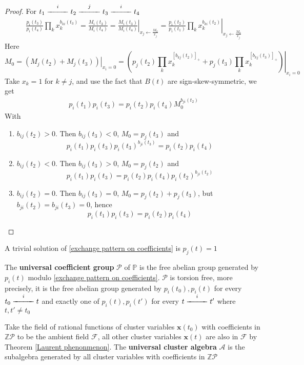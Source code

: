 \documentclass[main]{subfiles}
\begin{document}
\begin{proof}
For $t_1\xedge it_2\xedge jt_3\xedge it_4$
\begin{align*}
\frac{p_i(t_3)}{p_i(t_4)}\prod_kx_k^{b_{ki}(t_3)}=\frac{M_i(t_3)}{M_i(t_4)}=\left.\frac{M_i(t_3)}{M_i(t_4)}\right|_{x_j\leftarrow\frac{M_0}{x_j}}=\left.\frac{p_i(t_2)}{p_i(t_1)}\prod_kx_k^{b_{ki}(t_2)}\right|_{x_j\leftarrow\frac{M_0}{x_j}}
\end{align*}
Here
\[M_0=\left.\left(M_j(t_2)+M_j(t_3)\right)\right|_{x_i=0}=\left.\left(p_j(t_2)\prod_kx_k^{[b_{kj}(t_2)]_+}+p_j(t_3)\prod_kx_k^{[b_{kj}(t_3)]_+}\right)\right|_{x_i=0}\]
Take $x_k=1$ for $k\neq j$, and use the fact that $B(t)$ are sign-skew-symmetric, we get
\begin{align*}
p_i(t_1)p_i(t_3)=p_i(t_2)p_i(t_4)M_0^{b_{ji}(t_2)}
\end{align*}
With
\begin{enumerate}[leftmargin=*,label=Case \arabic*:]
\item $b_{ij}(t_2)>0$. Then $b_{ij}(t_3)<0$, $M_0=p_j(t_3)$ and
\[p_i(t_1)p_i(t_3)p_i(t_3)^{b_{ji}(t_3)}=p_i(t_2)p_i(t_4)\]
\item $b_{ij}(t_2)<0$. Then $b_{ij}(t_3)>0$, $M_0=p_j(t_2)$ and
\[p_i(t_1)p_i(t_3)=p_i(t_2)p_i(t_4)p_i(t_2)^{b_{ji}(t_2)}\]
\item $b_{ij}(t_2)=0$. Then $b_{ij}(t_3)=0$, $M_0=p_j(t_2)+p_j(t_3)$, but $b_{ji}(t_2)=b_{ji}(t_3)=0$, hence
\[p_i(t_1)p_i(t_3)=p_i(t_2)p_i(t_4)\]
\end{enumerate}
\end{proof}

\begin{note}
A trivial solution of \eqref{exchange pattern on coefficients} is $p_j(t)=1$
\end{note}

\begin{proposition}
The \textbf{universal coefficient group} $\mathcal P$ of $\mathbb P$ is the free abelian group generated by $p_i(t)$ modulo \eqref{exchange pattern on coefficients}. $\mathcal P$ is torsion free, more precisely, it is the free abelian group generated by $p_i(t_0),p_i(t)$ for every $t_0\xedge it$ and exactly one of $p_i(t),p_i(t')$ for every $t\xedge it'$ where $t,t'\neq t_0$
\end{proposition}

\begin{definition}
Take the field of rational functions of cluster variables $\mathbf x(t_0)$ with coefficients in $\mathbb Z\mathcal P$ to be the ambient field $\mathcal F$, all other cluster variables $\mathbf x(t)$ are also in $\mathcal F$ by Theorem \ref{Laurent phenonmenon}. The \textbf{universal cluster algebra} $\mathcal A$ is the subalgebra generated by all cluster variables with coefficients in $\mathbb{Z}\mathcal P$
\end{definition}
\end{document}
